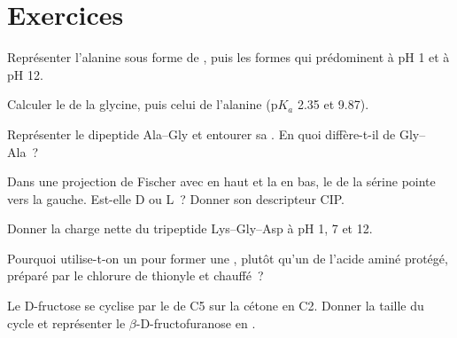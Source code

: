 \section{Exercices}

\begin{exercise}[$\star$]\label{exo:b2:biomolecules:1}
Représenter l'alanine sous forme de , puis les formes qui prédominent à pH 1 et à pH 12.
\end{exercise}

\begin{exercise}[$\star$]\label{exo:b2:biomolecules:2}
Calculer le  de la glycine, puis celui de l'alanine ($\mathrm pK_a$ 2.35 et 9.87).
\end{exercise}

\begin{exercise}[$\star$]\label{exo:b2:biomolecules:3}
Représenter le dipeptide Ala--Gly et entourer sa . En quoi diffère-t-il de Gly--Ala~?
\end{exercise}

\begin{exercise}[$\star$]\label{exo:b2:biomolecules:4}
Dans une projection de Fischer avec  en haut et la   en bas, le
 de la sérine pointe vers la gauche. Est-elle D ou L~? Donner son descripteur CIP.
\end{exercise}

\begin{exercise}[$\star\star$]\label{exo:b2:biomolecules:5}
Donner la charge nette du tripeptide Lys--Gly--Asp à pH 1, 7 et 12.
\end{exercise}

\begin{exercise}[$\star\star$]\label{exo:b2:biomolecules:6}
Pourquoi utilise-t-on un  pour former une , plutôt qu'un  de l'acide aminé protégé, préparé par le chlorure de thionyle et chauffé~?
\end{exercise}

\begin{exercise}[$\star\star$]\label{exo:b2:biomolecules:7}
Le D-fructose se cyclise par le  de C5 sur la cétone en C2. Donner la taille du cycle et
représenter le $\beta$-D-fructofuranose en .
\end{exercise}

